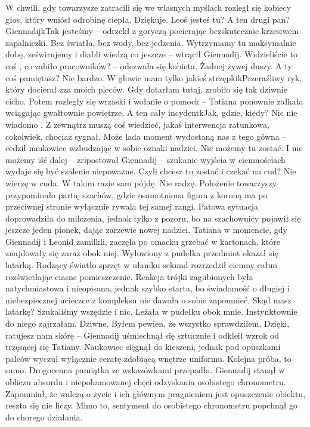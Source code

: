 \documentclass[../MAIN.tex]{subfiles}
\begin{document}
W chwili, gdy towarzysze zatracili się we własnych myślach rozległ się kobiecy głos, który wniósł odrobinę ciepła. 
\sx Dziękuje. Leoś jesteś tu? A ten drugi pan? 
\xx Giennadij\3kTak jesteśmy -- odrzekł z goryczą pocierając bezskutecznie krzesiwem zapalniczki. 
\xx Bez światła, bez wody, bez jedzenia. Wytrzymamy tu maksymalnie dobę, ześwirujemy i diabli wiedzą co jeszcze -- wtrącił Giennadij. 
\xx Widzieliście to coś , co zabiło pracowników? -- odezwała się kobieta. 
\xx Żadnej żywej duszy. A ty coś pamiętasz? 
\xx Nie bardzo. W głowie mam tylko jakieś strzępki\3kPrzeraźliwy ryk, który docierał zza moich pleców. Gdy dotarłam tutaj, zrobiło się tak dziwnie cicho. Potem rozległy się wrzaski i wołanie o pomoc\3k -- Tatiana ponownie załkała wciągając gwałtownie powietrze. 
\xx A ten cały incydent\3kJak, gdzie, kiedy? Nic nie wiadomo . Z zewnątrz muszą coś wiedzieć, jakaś interwencja ratunkowa, cokolwiek, chociaż sygnał. Może lada moment wydostaną nas z tego gówna -- cedził naukowiec wzbudzając w sobie oznaki nadziei. 
\xx Nie możemy tu zostać. 
\xx I nie możemy iść dalej -- zripostował Giennadij -- szukanie wyjścia w ciemnościach wydaje się być szalenie niepoważne. 
\xx Czyli chcesz tu zostać i czekać na cud? 
\xx Nie wierzę w cuda. 
\xx W takim razie sam pójdę. 
\xx Nie radzę. 
\qd
Położenie towarzyszy przypominało partię szachów, gdzie osamotniona figura z koroną ma po przeciwnej stronie wyłącznie rywala tej samej rangi. Patowa sytuacja doprowadziła do milczenia, jednak tylko z pozoru, bo na szachownicy pojawił się jeszcze jeden pionek, dając zarzewie nowej nadziei. Tatiana w momencie, gdy Giennadij i Leonid zamilkli, zaczęła po omacku grzebać w kartonach, które znajdowały się zaraz obok niej. Wyłowiony z pudełka przedmiot okazał się latarką. Rodzący światło sprzęt w ułamku sekund rozrzedził ciemny całun rozświetlając ciasne pomieszczenie. Reakcja trójki zagubionych była natychmiastowa i nieopisana, jednak szybko starta, bo świadomość o długiej i niebezpiecznej ucieczce z kompleksu nie dawała o sobie zapomnieć. 
\sx Skąd masz latarkę? Szukaliśmy wszędzie i nic. 
\xx Leżała w pudełku obok mnie. Instynktownie do niego zajrzałam. 
\xx Dziwne. Byłem pewien, że wszystko sprawdziłem. Dzięki, ratujesz nam skórę -- Giennadij uśmiechnął się sztucznie i odkleił wzrok od trzęsącej się Tatiany. 
\qd
Naukowiec sięgnął do kieszeni, jednak pod opuszkami palców wyczuł wyłącznie ceratę zdobiącą wnętrze uniformu. Kolejna próba, to samo. Drogocenna pamiątka ze wskazówkami przepadła. Giennadij stanął w obliczu absurdu i niepohamowanej chęci odzyskania osobistego chronometru. Zapomniał, że walczą o życie i ich głównym pragnieniem jest opuszczenie obiektu, reszta się nie liczy. Mimo to, sentyment do osobistego chronometru popchnął go do chorego działania. 
\end{document}
